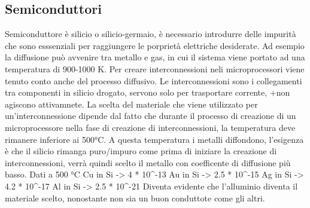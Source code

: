 \documentclass{article}%
\begin{document}
\subsection{ Semiconduttori }%
\label{subsec:Semiconduttori}%
Semiconduttore è silicio o silicio{-}germaio, è necessario introdurre delle impurità che sono esssenziali per raggiungere le porprietà elettriche desiderate.\newline%
%
\newline%
%
Ad esempio la diffusione può avvenire tra metallo e gas, in cui il sistema viene portato ad una temperatura di 900{-}1000 K.\newline%
%
\newline%
%
Per creare interconnessioni neli microprocessori viene tenuto conto anche del processo diffusivo.\newline%
%
Le interconnessioni sono i collegamenti tra componenti in silicio drogato, servono solo per trasportare corrente, +non agiscono attivamnete.\newline%
%
La scelta del materiale che viene utilizzato per un'interconnessione dipende dal fatto che durante il processo di creazione di un microprocessore nella fase di creazione di interconnessioni, la temperatura deve rimanere inferiore ai 500°C.\newline%
%
A questa temperatura i metalli diffondono, l'esigenza è che il silicio rimanga puro/impuro come prima di iniziare la creazione di interconnessioni, verrà quindi scelto il metallo con coefficente di diffusione più basso.\newline%
%
\newline%
%
Dati a 500 °C\newline%
%
Cu in Si {-}> 4   * 10\^{}{-}13\newline%
%
Au in Si {-}> 2.5 * 10\^{}{-}15\newline%
%
Ag in Si {-}> 4.2 * 10\^{}{-}17\newline%
%
Al in Si {-}> 2.5 * 10\^{}{-}21\newline%
%
\newline%
%
Diventa evidente che l'alluminio diventa il materiale scelto, nonostante non sia un buon conduttote come gli altri.\newline%
%
\newline%

%
\end{document}
